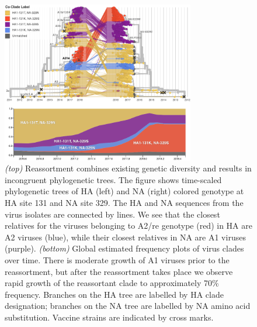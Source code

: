 \begin{figure}[t]
    \begin{center}
    \includegraphics[width=0.75\textwidth]{figures/ha_na_tangle.png}
    \end{center}
    \caption{\textit{(top)} Reassortment combines existing genetic diversity and results in incongruent phylogenetic trees. The figure shows time-scaled phylogenetic trees of HA (left) and NA (right) colored genotype at HA site 131 and NA site 329. The HA and NA sequences from the virus isolates are connected by lines. We see that the closest relatives for the viruses belonging to A2/re genotype (red) in HA are A2 viruses (blue), while their closest relatives in NA are A1 viruses (purple). \textit{(bottom)} Global estimated frequency plots of virus clades over time. There is moderate growth of A1 viruses prior to the reassortment, but after the reassortment takes place we observe rapid growth of the reassortant clade to approximately 70\% frequency. Branches on the HA tree are labelled by HA clade designation; branches on the NA tree are labelled by NA amino acid substitution. Vaccine strains are indicated by cross marks.}
    \label{fig:tangle}
\end{figure}

